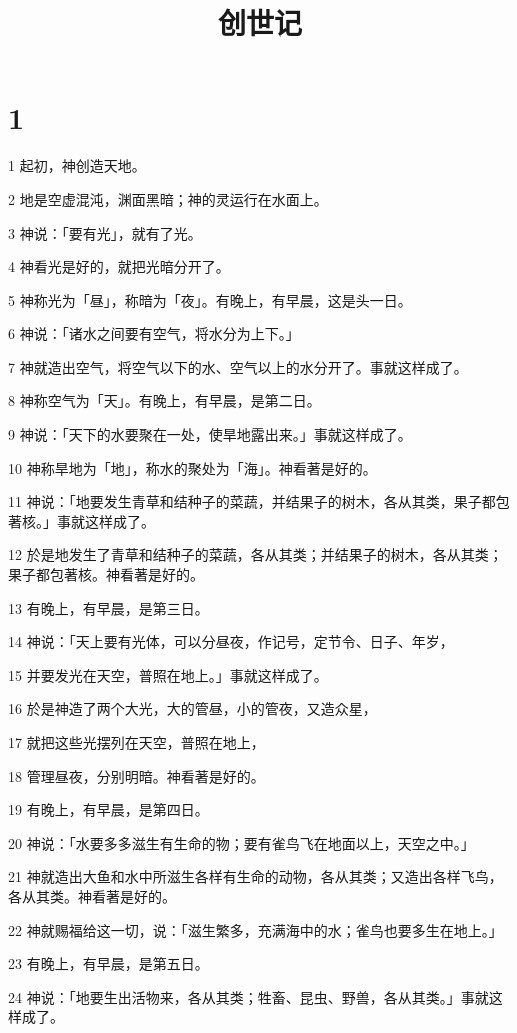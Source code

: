 

\title{创世记}


\chapter{1}

\par 1 起初，神创造天地。
\par 2 地是空虚混沌，渊面黑暗；神的灵运行在水面上。
\par 3 神说：「要有光」，就有了光。
\par 4 神看光是好的，就把光暗分开了。
\par 5 神称光为「昼」，称暗为「夜」。有晚上，有早晨，这是头一日。
\par 6 神说：「诸水之间要有空气，将水分为上下。」
\par 7 神就造出空气，将空气以下的水、空气以上的水分开了。事就这样成了。
\par 8 神称空气为「天」。有晚上，有早晨，是第二日。
\par 9 神说：「天下的水要聚在一处，使旱地露出来。」事就这样成了。
\par 10 神称旱地为「地」，称水的聚处为「海」。神看著是好的。
\par 11 神说：「地要发生青草和结种子的菜蔬，并结果子的树木，各从其类，果子都包著核。」事就这样成了。
\par 12 於是地发生了青草和结种子的菜蔬，各从其类；并结果子的树木，各从其类；果子都包著核。神看著是好的。
\par 13 有晚上，有早晨，是第三日。
\par 14 神说：「天上要有光体，可以分昼夜，作记号，定节令、日子、年岁，
\par 15 并要发光在天空，普照在地上。」事就这样成了。
\par 16 於是神造了两个大光，大的管昼，小的管夜，又造众星，
\par 17 就把这些光摆列在天空，普照在地上，
\par 18 管理昼夜，分别明暗。神看著是好的。
\par 19 有晚上，有早晨，是第四日。
\par 20 神说：「水要多多滋生有生命的物；要有雀鸟飞在地面以上，天空之中。」
\par 21 神就造出大鱼和水中所滋生各样有生命的动物，各从其类；又造出各样飞鸟，各从其类。神看著是好的。
\par 22 神就赐福给这一切，说：「滋生繁多，充满海中的水；雀鸟也要多生在地上。」
\par 23 有晚上，有早晨，是第五日。
\par 24 神说：「地要生出活物来，各从其类；牲畜、昆虫、野兽，各从其类。」事就这样成了。
